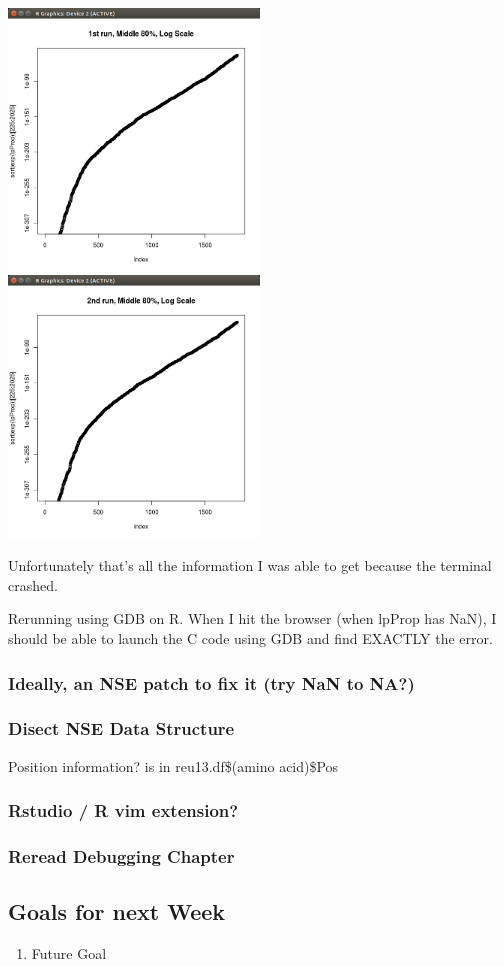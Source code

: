 \begin{enumerate}
\includegraphics[width=0.5\textwidth]{data/middle80log1.png}
\includegraphics[width=0.5\textwidth]{data/middle80log2.png}

Unfortunately that's all the information I was able to get because the terminal crashed. 

Rerunning using GDB on R. When I hit the browser (when lpProp has NaN), I should be able to launch the C code using GDB and find EXACTLY the error.

\end{enumerate}







\subsubsection{Ideally, an NSE patch to fix it (try NaN to NA?)}

\subsubsection{Disect NSE Data Structure}

Position information? is in reu13.df\$(amino acid)\$Pos

\subsubsection{Rstudio / R vim extension?}

\subsubsection{Reread Debugging Chapter}




\subsection{Goals for next Week}
\begin{enumerate}
\item Future Goal
\end{enumerate}


